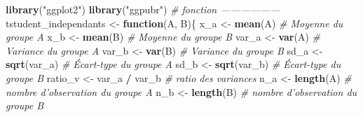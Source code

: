 \documentclass[
  11pt,
  french,
]{book}
\makeatletter
\newenvironment{Shaded}{\begin{snugshade}}{\end{snugshade}}
\newcommand{\CommentTok}[1]{\textcolor[rgb]{0.56,0.35,0.01}{\textit{#1}}}
\newcommand{\ControlFlowTok}[1]{\textcolor[rgb]{0.13,0.29,0.53}{\textbf{#1}}}
\newcommand{\KeywordTok}[1]{\textcolor[rgb]{0.13,0.29,0.53}{\textbf{#1}}}
\newcommand{\NormalTok}[1]{#1}
\newcommand{\OperatorTok}[1]{\textcolor[rgb]{0.81,0.36,0.00}{\textbf{#1}}}
\newcommand{\StringTok}[1]{\textcolor[rgb]{0.31,0.60,0.02}{#1}}
\newenvironment{kframe}{%
\medskip{}
\setlength{\fboxsep}{.8em}
 \def\at@end@of@kframe{}%
 \ifinner\ifhmode%
  \def\at@end@of@kframe{\end{minipage}}%
  \begin{minipage}{\columnwidth}%
 \fi\fi%
 \def\FrameCommand##1{\hskip\@totalleftmargin \hskip-\fboxsep
 \colorbox{shadecolor}{##1}\hskip-\fboxsep
     \hskip-\linewidth \hskip-\@totalleftmargin \hskip\columnwidth}%
 \MakeFramed {\advance\hsize-\width
   \@totalleftmargin\z@ \linewidth\hsize
   \@setminipage}}%
 {\par\unskip\endMakeFramed%
 \at@end@of@kframe}
\renewenvironment{Shaded}{\begin{kframe}}{\end{kframe}}
\makeatother
\begin{document}
\begin{Shaded}
\begin{Highlighting}[]
\KeywordTok{library}\NormalTok{(}\StringTok{"ggplot2"}\NormalTok{)}
\KeywordTok{library}\NormalTok{(}\StringTok{"ggpubr"}\NormalTok{)}
\CommentTok{# fonction ------------------}
\NormalTok{tstudent_independants <-}\StringTok{ }\ControlFlowTok{function}\NormalTok{(A, B)\{}
\NormalTok{    x_a <-}\StringTok{ }\KeywordTok{mean}\NormalTok{(A)           }\CommentTok{# Moyenne du groupe A}
\NormalTok{    x_b <-}\StringTok{ }\KeywordTok{mean}\NormalTok{(B)           }\CommentTok{# Moyenne du groupe B}
\NormalTok{    var_a <-}\StringTok{ }\KeywordTok{var}\NormalTok{(A)          }\CommentTok{# Variance du groupe A}
\NormalTok{    var_b <-}\StringTok{ }\KeywordTok{var}\NormalTok{(B)          }\CommentTok{# Variance du groupe B}
\NormalTok{    sd_a <-}\StringTok{ }\KeywordTok{sqrt}\NormalTok{(var_a)      }\CommentTok{# Écart-type du groupe A}
\NormalTok{    sd_b <-}\StringTok{ }\KeywordTok{sqrt}\NormalTok{(var_b)      }\CommentTok{# Écart-type du groupe B}
\NormalTok{    ratio_v <-}\StringTok{ }\NormalTok{var_a }\OperatorTok{/}\StringTok{ }\NormalTok{var_b }\CommentTok{# ratio des variances}
\NormalTok{    n_a <-}\StringTok{ }\KeywordTok{length}\NormalTok{(A)         }\CommentTok{# nombre d'observation du groupe A}
\NormalTok{    n_b <-}\StringTok{ }\KeywordTok{length}\NormalTok{(B)         }\CommentTok{# nombre d'observation du groupe B}
    

\end{Highlighting}
\end{Shaded}
\end{document}
